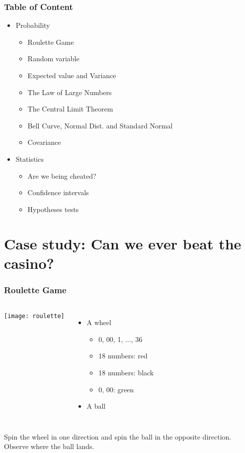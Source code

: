 \documentclass[
  ignorenonframetext,
]{beamer}
\providecommand{\tightlist}{%
  \setlength{\itemsep}{0pt}\setlength{\parskip}{0pt}}
\begin{document}
\begin{frame}
\frametitle{Table of Content}

\begin{itemize}
\tightlist
\item
  Probability

  \begin{itemize}
  \tightlist
  \item
    Roulette Game
  \item
    Random variable
  \item
    Expected value and Variance
  \item
    The Law of Large Numbers
  \item
    The Central Limit Theorem
  \item
    Bell Curve, Normal Dist. and Standard Normal
  \item
    Covariance
  \end{itemize}
\item
  Statistics

  \begin{itemize}
  \tightlist
  \item
    Are we being cheated?
  \item
    Confidence intervals
  \item
    Hypotheses tests
  \end{itemize}
\end{itemize}
\end{frame}

\hypertarget{case-study-can-we-ever-beat-the-casino}{%
\section{Case study: Can we ever beat the
casino?}\label{case-study-can-we-ever-beat-the-casino}}

\begin{frame}
\frametitle{Roulette Game}

\begin{columns}
   \centering
   \texttt{[image: roulette]}
   \centering
   \begin{itemize}
   \item A wheel 
   \begin{itemize}
      \item 0, 00, 1, ..., 36
      \item 18 numbers: red
      \item 18 numbers: black
      \item 0, 00: green
   \end{itemize}
   \item A ball
   \end{itemize}
 \end{columns}

Spin the wheel in one direction and spin the ball in the opposite
direction. Observe where the ball lands.
\end{frame}
\end{document}
